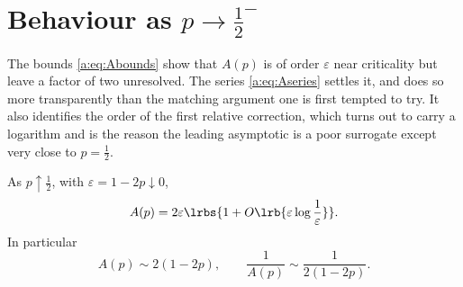 \section{Behaviour as \texorpdfstring{$p\to\tfrac12^-$}{p to 1/2}}
\label{a:sec:nearcritical}

The bounds \cref{a:eq:Abounds} show that $A(p)$ is of order $\varepsilon$ near
criticality but leave a factor of two unresolved. The series \cref{a:eq:Aseries}
settles it, and does so more transparently than the matching argument one is first
tempted to try. It also identifies the order of the first relative correction,
which turns out to carry a logarithm and is the reason the leading asymptotic is a
poor surrogate except very close to $p=\tfrac12$.

\begin{theorem}
\label{a:thm:nearcritical}
As $p\uparrow\tfrac12$, with $\varepsilon = 1-2p\downarrow0$,
\begin{equation}
\label{a:eq:Anearcritical}
A(p) = 2\varepsilon\lrbs{1+O\lrb{\varepsilon\log\frac1\varepsilon}} .
\end{equation}
In particular
\begin{equation}
\label{a:eq:Aasym}
A(p)\sim2(1-2p),
\qquad
\frac{1}{A(p)}\sim\frac{1}{2(1-2p)} .
\end{equation}
\end{theorem}

